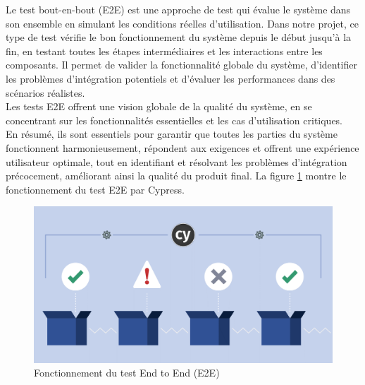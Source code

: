 Le test bout-en-bout (E2E) est une approche de test qui évalue le système 
dans son ensemble en simulant les conditions réelles d'utilisation. Dans 
notre projet, ce type de test vérifie le bon fonctionnement du système 
depuis le début jusqu’à la fin, en testant toutes les étapes intermédiaires 
et les interactions entre les composants. Il permet de valider la 
fonctionnalité globale du système, d'identifier les problèmes d’intégration 
potentiels et d'évaluer les performances dans des scénarios réalistes. 
\\
Les tests E2E offrent une vision globale de la qualité du système, 
en se concentrant sur les fonctionnalités essentielles et les cas 
d'utilisation critiques. 
\\
En résumé, ils sont essentiels pour garantir 
que toutes les parties du système fonctionnent harmonieusement, répondent 
aux exigences et offrent une expérience utilisateur optimale, tout en 
identifiant et résolvant les problèmes d’intégration précocement, 
améliorant ainsi la qualité du produit final. La figure \ref{fig:e2e} montre le 
fonctionnement du test E2E par Cypress.
\begin{figure}[htbp]
   \centering
   \includegraphics[scale=0.2]{cypress/1.png} 
   \caption{Fonctionnement du test End to End (E2E)}
   \label{fig:e2e}
\end{figure}



